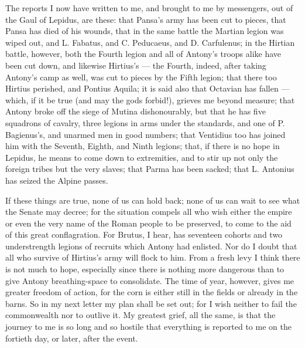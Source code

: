  The reports I now have written to me, and brought to me by messengers, out of the Gaul of Lepidus, are these: that Pansa's army has been cut to pieces, that Pansa has died of his wounds, that in the same battle the Martian legion was wiped out, and L. Fabatus, and C. Peducaeus, and D. Carfulenus; in the Hirtian battle, however, both the Fourth legion and all of Antony's troops alike have been cut down, and likewise Hirtius's --- the Fourth, indeed, after taking Antony's camp as well, was cut to pieces by the Fifth legion; that there too Hirtius perished, and Pontius Aquila; it is said also that Octavian has fallen --- which, if it be true (and may the gods forbid!), grieves me beyond measure; that Antony broke off the siege of Mutina dishonourably, but that he has five squadrons of cavalry, three legions in arms under the standards, and one of P. Bagienus's, and unarmed men in good numbers; that Ventidius too has joined him with the Seventh, Eighth, and Ninth legions; that, if there is no hope in Lepidus, he means to come down to extremities, and to stir up not only the foreign tribes but the very slaves; that Parma has been sacked; that L. Antonius has seized the Alpine passes.

 If these things are true, none of us can hold back; none of us can wait to see what the Senate may decree; for the situation compels all who wish either the empire or even the very name of the Roman people to be preserved, to come to the aid of this great conflagration. For Brutus, I hear, has seventeen cohorts and two understrength legions of recruits which Antony had enlisted. Nor do I doubt that all who survive of Hirtius's army will flock to him. From a fresh levy I think there is not much to hope, especially since there is nothing more dangerous than to give Antony breathing-space to consolidate. The time of year, however, gives me greater freedom of action, for the corn is either still in the fields or already in the barns. So in my next letter my plan shall be set out; for I wish neither to fail the commonwealth nor to outlive it. My greatest grief, all the same, is that the journey to me is so long and so hostile that everything is reported to me on the fortieth day, or later, after the event.
